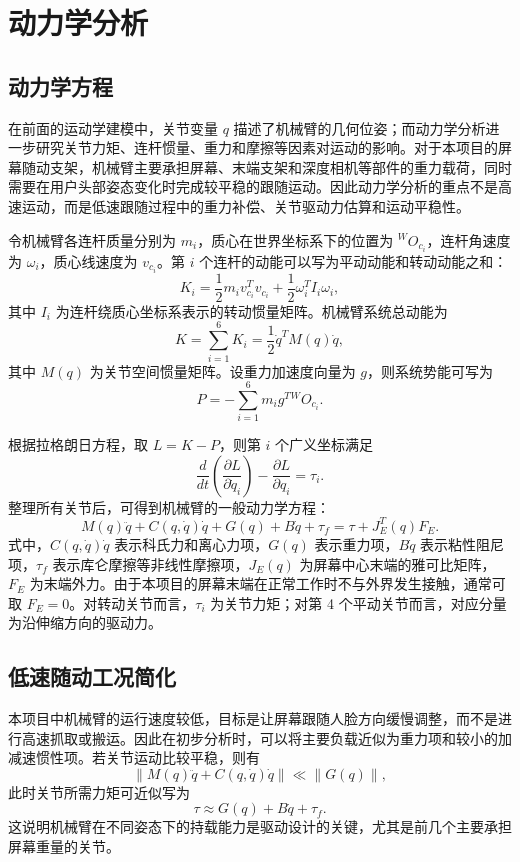 \documentclass[12pt,a4paper,UTF8]{article}
\begin{document}
\clearpage
\section{动力学分析}

\subsection{动力学方程}

在前面的运动学建模中，关节变量 $q$ 描述了机械臂的几何位姿；而动力学分析进一步研究关节力矩、连杆惯量、重力和摩擦等因素对运动的影响。对于本项目的屏幕随动支架，机械臂主要承担屏幕、末端支架和深度相机等部件的重力载荷，同时需要在用户头部姿态变化时完成较平稳的跟随运动。因此动力学分析的重点不是高速运动，而是低速跟随过程中的重力补偿、关节驱动力估算和运动平稳性。

令机械臂各连杆质量分别为 $m_i$，质心在世界坐标系下的位置为 ${}^{W}O_{c_i}$，连杆角速度为 $\omega_i$，质心线速度为 $v_{c_i}$。第 $i$ 个连杆的动能可以写为平动动能和转动动能之和：
\[
K_i=\frac{1}{2}m_i v_{c_i}^{T}v_{c_i}
+\frac{1}{2}\omega_i^{T}I_i\omega_i ,
\]
其中 $I_i$ 为连杆绕质心坐标系表示的转动惯量矩阵。机械臂系统总动能为
\[
K=\sum_{i=1}^{6}K_i
=\frac{1}{2}\dot q^{T}M(q)\dot q ,
\]
其中 $M(q)$ 为关节空间惯量矩阵。设重力加速度向量为 $g$，则系统势能可写为
\[
P=-\sum_{i=1}^{6}m_i g^{T}{}^{W}O_{c_i}.
\]

根据拉格朗日方程，取 $L=K-P$，则第 $i$ 个广义坐标满足
\[
\frac{d}{dt}\left(\frac{\partial L}{\partial \dot q_i}\right)
-\frac{\partial L}{\partial q_i}
=\tau_i .
\]
整理所有关节后，可得到机械臂的一般动力学方程：
\[
M(q)\ddot q+C(q,\dot q)\dot q+G(q)+B\dot q+\tau_f
=\tau+J_E^{T}(q)F_E .
\]
式中，$C(q,\dot q)\dot q$ 表示科氏力和离心力项，$G(q)$ 表示重力项，$B\dot q$ 表示粘性阻尼项，$\tau_f$ 表示库仑摩擦等非线性摩擦项，$J_E(q)$ 为屏幕中心末端的雅可比矩阵，$F_E$ 为末端外力。由于本项目的屏幕末端在正常工作时不与外界发生接触，通常可取 $F_E=0$。对转动关节而言，$\tau_i$ 为关节力矩；对第 4 个平动关节而言，对应分量为沿伸缩方向的驱动力。

\subsection{低速随动工况简化}

本项目中机械臂的运行速度较低，目标是让屏幕跟随人脸方向缓慢调整，而不是进行高速抓取或搬运。因此在初步分析时，可以将主要负载近似为重力项和较小的加减速惯性项。若关节运动比较平稳，则有
\[
\left\|M(q)\ddot q+C(q,\dot q)\dot q\right\|
\ll
\left\|G(q)\right\| ,
\]
此时关节所需力矩可近似写为
\[
\tau \approx G(q)+B\dot q+\tau_f .
\]
这说明机械臂在不同姿态下的持载能力是驱动设计的关键，尤其是前几个主要承担屏幕重量的关节。
\end{document}
